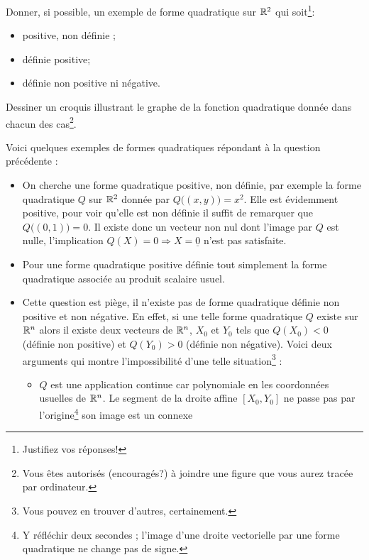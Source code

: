 \documentclass[11pt, a4paper]{article}
\begin{document}
\begin{question}
  Donner, si possible, un exemple de forme quadratique sur $\mathbb{R}^2$ qui
  soit\footnote{Justifiez vos réponses!}:
  \begin{itemize}
  \item[\textbullet]
    positive, non définie ;
  \item[\textbullet]
    définie positive; 
  \item[\textbullet]
    définie non positive ni négative.
  \end{itemize}
  Dessiner un croquis illustrant le graphe de la fonction quadratique
  donnée dans chacun des cas\footnote{Vous êtes autorisés
    (encouragés?) à joindre une figure que vous aurez tracée par
    ordinateur.}.
\end{question}
\begin{solution}
  Voici quelques exemples de formes quadratiques répondant à la
  question précédente : 
  \begin{itemize}
  \item[\textbullet] On cherche une forme quadratique positive, non
    définie, par exemple la forme quadratique $Q$ sur $\mathbb{R}^2$ donnée
    par $Q\big((x,y)\big) = x^2$. Elle est évidemment positive, pour
    voir qu'elle est non définie il suffit de remarquer que
    $Q\big((0,1)\big) = 0$. Il existe donc un vecteur non nul dont
    l'image par $Q$ est nulle, l'implication
    $Q(X) = 0 \Rightarrow X = \underline{0}$ n'est pas satisfaite.
  \item[\textbullet] Pour une forme quadratique positive définie tout
    simplement la forme quadratique associée au produit scalaire
    usuel.
  \item[\textbullet] Cette question est piège, il n'existe pas de forme
    quadratique définie non positive et non négative. En effet, si une
    telle forme quadratique $Q$ existe sur $\mathbb{R}^n$ alors il existe deux
    vecteurs de $\mathbb{R}^n$, $X_0$ et $Y_0$ tels que $Q(X_0) < 0$ (définie
    non positive) et $Q(Y_0) > 0$ (définie non négative). Voici deux
    arguments qui montre l'impossibilité d'une telle
    situation\footnote{Vous pouvez en trouver d'autres, certainement.}
    :
    \begin{itemize}
    \item $Q$ est une application continue car polynomiale en les
      coordonnées usuelles de $\mathbb{R}^n$. Le segment de la droite affine
      $[X_0, Y_0]$ ne passe pas par l'origine\footnote{Y réfléchir
        deux secondes ; l'image d'une droite vectorielle par une forme
        quadratique ne change pas de signe.} son image est un connexe

\end{itemize}
\end{itemize}
\end{solution}
\end{document}
